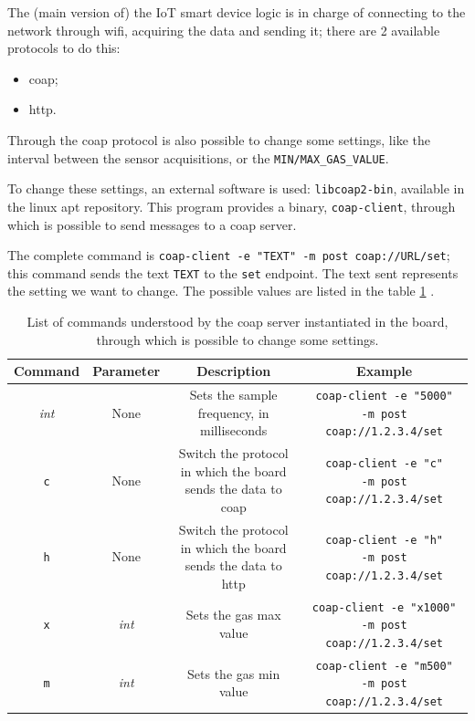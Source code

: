 \documentclass[]{article}
\begin{document}
The (main version of) the IoT smart device logic is in charge of connecting to the network through wifi, acquiring the data and sending it; there are 2 available protocols to do this:
\begin{itemize}
	\item coap;
	\item http.
\end{itemize}

Through the coap protocol is also possible to change some settings, like the interval between the sensor acquisitions, or the \texttt{MIN/MAX\_GAS\_VALUE}. 

To change these settings, an external software is used: \texttt{libcoap2-bin}, available in the linux apt repository. This program provides a binary, \texttt{coap-client}, through which is possible to send messages to a coap server. 

The complete command is \texttt{coap-client -e "TEXT"  -m post coap://URL/set}; this command sends the text \texttt{TEXT} to the \texttt{set} endpoint. The text sent represents the setting we want to change. The possible values are listed in the table \ref{commands} .


\begin{table}
	\centering
	\begin{tabular}{|c|c|c|c|}
		\hline
		\textbf{Command} & \textbf{Parameter} & \textbf{Description} & \textbf{Example} \\
		\hline
		\textit{int} & None & \makecell{Sets the sample \\ frequency, in milliseconds } & \makecell{\texttt{coap-client -e "5000"} \\ \texttt{-m post coap://1.2.3.4/set}} \\
		\hline
		\texttt{c} & None & \makecell{Switch the protocol \\ in which the board \\ sends the data to coap } & \makecell{\texttt{coap-client -e "c"} \\ \texttt{-m post coap://1.2.3.4/set}} \\
		\hline
		\texttt{h} & None & \makecell{Switch the protocol \\ in which the board \\ sends the data to http }  & \makecell{\texttt{coap-client -e "h"} \\ \texttt{-m post coap://1.2.3.4/set}} \\
		\hline
		\texttt{x} & \textit{int} & Sets the gas max value                                         & \makecell{\texttt{coap-client -e "x1000"} \\ \texttt{-m post coap://1.2.3.4/set}} \\
		\texttt{m} & \textit{int} & Sets the gas min value                                         & \makecell{\texttt{coap-client -e "m500"} \\ \texttt{-m post coap://1.2.3.4/set}} \\
		\hline
	\end{tabular} 
	\caption{\label{commands}List of commands understood by the coap server instantiated in the board, through which is possible to change some settings.}
\end{table}
\end{document}
